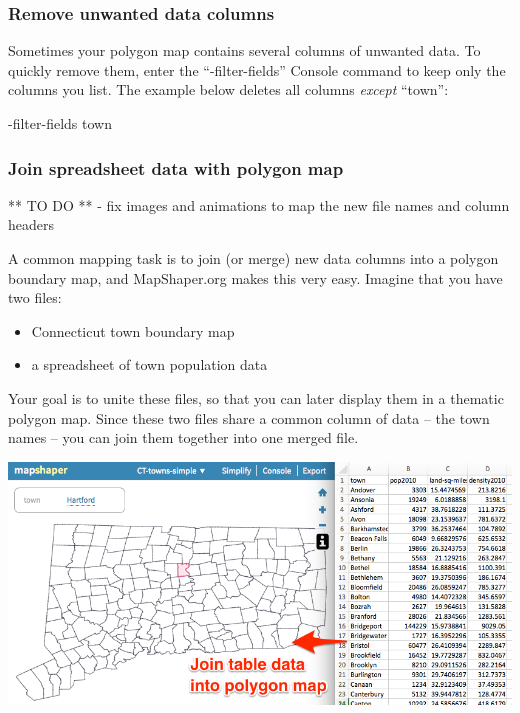 \documentclass[
  english,
]{book}
\newenvironment{Shaded}{\begin{snugshade}}{\end{snugshade}}
\newcommand{\NormalTok}[1]{#1}
\providecommand{\tightlist}{%
  \setlength{\itemsep}{0pt}\setlength{\parskip}{0pt}}
\begin{document}
\hypertarget{remove-unwanted-data-columns}{%
\subsubsection*{Remove unwanted data columns}\label{remove-unwanted-data-columns}}

Sometimes your polygon map contains several columns of unwanted data. To quickly remove them, enter the ``-filter-fields'' Console command to keep only the columns you list. The example below deletes all columns \emph{except} ``town'':

\begin{Shaded}
\begin{Highlighting}[]
\NormalTok{{-}filter{-}fields town}
\end{Highlighting}
\end{Shaded}

\hypertarget{join-spreadsheet-data-with-polygon-map}{%
\subsubsection*{Join spreadsheet data with polygon map}\label{join-spreadsheet-data-with-polygon-map}}

** TO DO **
- fix images and animations to map the new file names and column headers

A common mapping task is to join (or merge) new data columns into a polygon boundary map, and MapShaper.org makes this very easy. Imagine that you have two files:

\begin{itemize}
\tightlist
\item
  Connecticut town boundary map
\item
  a spreadsheet of town population data
\end{itemize}

Your goal is to unite these files, so that you can later display them in a thematic polygon map. Since these two files share a common column of data -- the town names -- you can join them together into one merged file.

\includegraphics{images/09-transform/mapshaper-join-table-concept.png}
\end{document}
